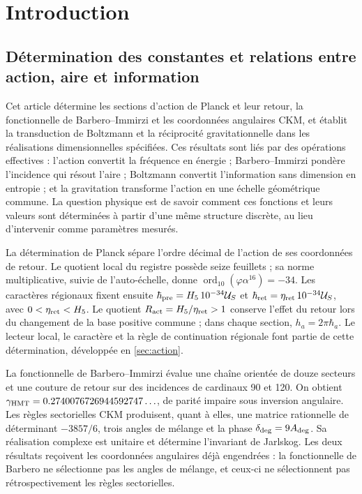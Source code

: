 \section{Introduction}

\subsection{Détermination des constantes et relations entre action, aire et information}

Cet article détermine les sections d'action de Planck et leur retour,
la fonctionnelle de Barbero--Immirzi et les coordonnées angulaires CKM, et
établit la transduction de Boltzmann et la réciprocité gravitationnelle dans
les réalisations dimensionnelles spécifiées. Ces résultats sont liés
par des opérations effectives : l'action convertit la fréquence en énergie ;
Barbero--Immirzi pondère l'incidence qui résout l'aire ; Boltzmann
convertit l'information sans dimension en entropie ; et la gravitation
transforme l'action en une échelle géométrique commune. La question physique
est de savoir comment ces fonctions et leurs valeurs sont déterminées à partir d'une même
structure discrète, au lieu d'intervenir comme paramètres mesurés.

La détermination de Planck sépare l'ordre décimal de l'action de ses
coordonnées de retour. Le quotient local du registre possède seize
feuillets ; sa norme multiplicative, suivie de l'auto-échelle, donne
\(\operatorname{ord}_{10}(\varphi\alpha^{16})=-34\).
Les caractères régionaux fixent ensuite
\(\hbar_{\rm pre}=H_5\,10^{-34}\mathcal U_S\) et
\(\hbar_{\rm ret}=\eta_{\rm ret}\,10^{-34}\mathcal U_S\),
avec \(0<\eta_{\rm ret}<H_5\). Le quotient
\(R_{\rm act}=H_5/\eta_{\rm ret}>1\) conserve l'effet du
retour lors du changement de la base positive commune ; dans chaque section,
\(h_a=2\pi\hbar_a\). Le lecteur local, le caractère et la règle de
continuation régionale font partie de cette détermination, développée
en \ref{sec:action}.

La fonctionnelle de Barbero--Immirzi évalue une chaîne orientée de douze
secteurs et une couture de retour sur des incidences de cardinaux 90
et 120. On obtient
\(\gamma_{\mathrm{HMT}}=0.2740076726944592747\ldots\), de parité impaire
sous inversion angulaire. Les règles sectorielles CKM produisent, quant à
elles, une matrice rationnelle de déterminant \(-3857/6\), trois angles
de mélange et la phase \(\delta_{\rm deg}=9A_{\rm deg}\).
Sa réalisation complexe est unitaire et détermine l'invariant de
Jarlskog. Les deux résultats reçoivent les coordonnées angulaires déjà
engendrées : la fonctionnelle de Barbero ne sélectionne pas les angles de mélange,
et ceux-ci ne sélectionnent pas rétrospectivement les règles sectorielles.

